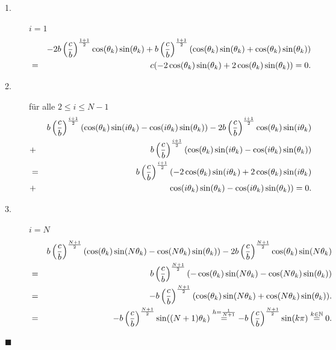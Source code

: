 \begin{description}
\item[1.] $i = 1$
\begin{eqnarray}
&& -2b\left(\frac{c}{b}\right)^{\frac{1+1}{2}} \cos(\theta_{k})\sin(\theta_{k}) + b \left(\frac{c}{b}\right)^{\frac{1+1}{2}} (\cos(\theta_{k}) \sin(\theta_{k}) + \cos(\theta_{k}) \sin(\theta_{k})) \notag \\
&=& c (-2\cos(\theta_{k})\sin(\theta_{k}) + 2\cos(\theta_{k})\sin(\theta_{k})) = 0. \notag
\end{eqnarray}
\item[2.] für alle $2 \le i \le N-1$
\begin{eqnarray}
&& b \left(\frac{c}{b}\right)^{\frac{i+1}{2}} (\cos(\theta_{k}) \sin(i \theta_{k}) - \cos(i \theta_{k}) \sin(\theta_{k})) - 2b\left(\frac{c}{b}\right)^{\frac{i+1}{2}} \cos(\theta_{k})\sin(i \theta_{k}) \notag \\
&+& b \left(\frac{c}{b}\right)^{\frac{i+1}{2}} (\cos(\theta_{k}) \sin(i \theta_{k}) - \cos(i \theta_{k}) \sin(\theta_{k})) \notag \\
&=& b \left(\frac{c}{b}\right)^{\frac{i+1}{2}} (-2\cos(\theta_{k})\sin(i\theta_{k}) + 2\cos(\theta_{k})\sin(i\theta_{k}) \notag \\
&+& \cos(i\theta_{k})\sin(\theta_{k}) - \cos(i\theta_{k})\sin(\theta_{k})) = 0. \notag
\end{eqnarray}
\item[3.] $i = N$
\begin{eqnarray}
&& b \left(\frac{c}{b}\right)^{\frac{N+1}{2}} (\cos(\theta_{k}) \sin(N \theta_{k}) - \cos(N \theta_{k}) \sin(\theta_{k})) - 2b\left(\frac{c}{b}\right)^{\frac{N+1}{2}} \cos(\theta_{k})\sin(N \theta_{k}) \notag \\
&=& b \left(\frac{c}{b}\right)^{\frac{N+1}{2}}(-\cos(\theta_{k})\sin(N\theta_{k}) - \cos(N\theta_{k})\sin(\theta_{k})) \notag \\
&=& -b \left(\frac{c}{b}\right)^{\frac{N+1}{2}}(\cos(\theta_{k})\sin(N\theta_{k}) + \cos(N\theta_{k})\sin(\theta_{k})). \notag \\
&=& -b \left(\frac{c}{b}\right)^{\frac{N+1}{2}} \sin((N+1)\theta_{k}) \overset{h = \frac{1}{N+1}}{=} -b \left(\frac{c}{b}\right)^{\frac{N+1}{2}} \sin(k\pi) \overset{k \in \mathbb{N}}{=} 0. \notag
\end{eqnarray}
\end{description}
\begin{flushright}
$\blacksquare$
\end{flushright}

